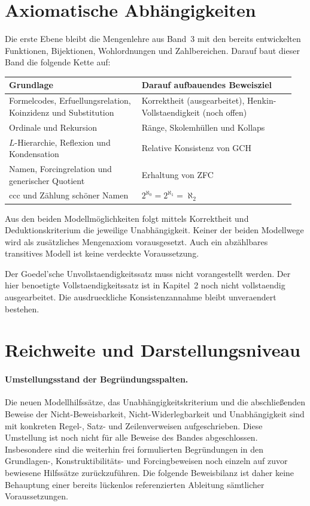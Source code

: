 \section{Axiomatische Abhängigkeiten}

Die erste Ebene bleibt die Mengenlehre aus Band~3 mit den bereits
entwickelten Funktionen, Bijektionen, Wohlordnungen und Zahlbereichen.
Darauf baut dieser Band die folgende Kette auf:
\begin{longtable}{@{}p{0.44\linewidth}p{0.51\linewidth}@{}}
\toprule
\textbf{Grundlage} & \textbf{Darauf aufbauendes Beweisziel}\\
\midrule\endhead
Formelcodes, Erfuellungsrelation, Koinzidenz und Substitution
 & Korrektheit (ausgearbeitet), Henkin-Vollstaendigkeit (noch offen)\\[0.5ex]
Ordinale und Rekursion & Ränge, Skolemhüllen und Kollaps\\[0.5ex]
\(L\)-Hierarchie, Reflexion und Kondensation
 & Relative Konsistenz von GCH\\[0.5ex]
Namen, Forcingrelation und generischer Quotient
 & Erhaltung von ZFC\\[0.5ex]
ccc und Zählung schöner Namen
 & \(2^{\aleph_0}=2^{\aleph_1}=\aleph_2\)\\
\bottomrule
\end{longtable}
Aus den beiden Modellmöglichkeiten folgt mittels Korrektheit und
Deduktionskriterium die jeweilige Unabhängigkeit.
Keiner der beiden Modellwege wird als zusätzliches Mengenaxiom
vorausgesetzt. Auch ein abzählbares transitives Modell ist keine
verdeckte Voraussetzung.

Der Goedel'sche Unvollstaendigkeitssatz muss nicht vorangestellt
werden. Der hier benoetigte Vollstaendigkeitssatz ist in Kapitel~2
noch nicht vollstaendig ausgearbeitet. Die ausdrueckliche
Konsistenzannahme bleibt unveraendert bestehen.

\section{Reichweite und Darstellungsniveau}

\paragraph{Umstellungsstand der Begr\"undungsspalten.}
Die neuen Modellhilfss\"atze, das Unabh\"angigkeitskriterium und die
abschlie\ss enden Beweise der Nicht-Beweisbarkeit, Nicht-Widerlegbarkeit
und Unabh\"angigkeit sind mit konkreten Regel-, Satz- und Zeilenverweisen
aufgeschrieben. Diese Umstellung ist noch nicht f\"ur alle Beweise des
Bandes abgeschlossen. Insbesondere sind die weiterhin frei formulierten
Begr\"undungen in den Grundlagen-, Konstruktibilit\"ats- und Forcingbeweisen
noch einzeln auf zuvor bewiesene Hilfss\"atze zur\"uckzuf\"uhren. Die
folgende Beweisbilanz ist daher keine Behauptung einer bereits l\"uckenlos
referenzierten Ableitung s\"amtlicher Voraussetzungen.


